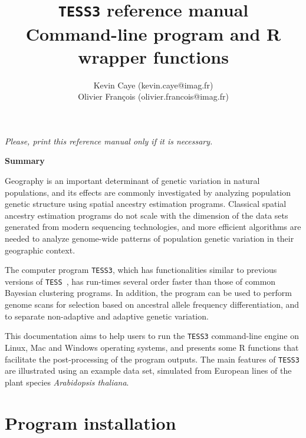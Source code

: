\documentclass[10pt,a4paper]{article}
\title{{\tt TESS3} reference manual \\
Command-line program and R wrapper functions
}
\author{
        Kevin Caye (kevin.caye@imag.fr)\\
        Olivier Fran\c cois (olivier.francois@imag.fr)\\
}
\begin{document}
\maketitle
\begin{center}
{\it Please, print this reference manual only if it is necessary.}
\end{center}

\vspace{.5cm}

\begin{center} {\bf Summary}
\end{center}


\vspace{.5cm}

Geography is an important determinant of genetic variation in natural populations, and its effects are commonly investigated by analyzing population genetic structure using spatial ancestry estimation programs. Classical spatial ancestry estimation programs do not scale with the dimension of the data sets generated from modern sequencing technologies, and more efficient algorithms are needed to analyze genome-wide patterns of population genetic variation in their geographic context.

The computer program {\tt TESS3}, which has functionalities similar to previous versions of {\tt TESS}~\cite{chen2007bayesian,durand2009spatial}, has run-times several order faster than those of common Bayesian clustering programs. In addition, the program can be used to perform genome scans for selection based on ancestral allele frequency differentiation, and to separate non-adaptive and adaptive genetic variation.

This documentation aims to help users to run the {\tt TESS3} command-line engine on Linux, Mac and Windows operating systems, and presents some R functions that facilitate the post-processing of the program outputs. The main features of {\tt TESS3} are illustrated using an example data set, simulated from European lines of the plant species {\it Arabidopsis thaliana}.

\vspace{.5cm}


\section{Program installation} 
\end{document}
